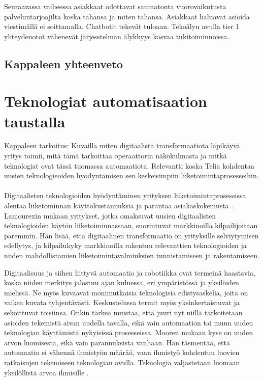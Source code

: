 \documentclass[finnish,12pt,a4paper,pdftex]{article}
\begin{document}
Seuraavassa vaiheessa asiakkaat odottavat saumatonta vuorovaikutusta palveluntarjoajilta koska tahansa ja miten tahansa.
Asiakkaat haluavat asioida viestimällä ei soittamalla.
Chatbotit tekevät tuloaan.
Tekoälyn avulla tier 1 yhteydenotot vähenevät järjesstelmän älykkyys kasvaa tukitoiminnoissa.

\subsection{Kappaleen yhteenveto}

\section{Teknologiat automatisaation taustalla}
Kappaleen tarkoitus: Kuvailla miten digitaalista transformaatiota läpikäyvä yritys toimii, mitä tämä tarkoittaa operaattorin näkökulmasta ja mitkä teknologiat ovat tässä tuomassa automaatiota. Relevantti koska Telia kohdentaa uusien teknologieoiden hyödyntämisen sen keskeisimpiin liiketoimintaprosesseihin. \\\\

Digitaalisten teknologioiden hyödyntäminen yrityksen liiketoimintaprosessissa alentaa liiketominnan käyttökustannuksia ja parantaa asiakaskokemusta  \citep{lamoureux, jungner}. Lamourexin mukaan yritykset, jotka omaksuvat uusien digitaalisten teknologioiden käytön liiketoiminnassaan, suoriutuvat markkinoilla kilpailijoitaan paremmin. Hän lisää, että digitaalinen transformaatio on yrityksille selviytymisen edellytys, ja kilpailukyky markkinoilla rakentuu relevanttien teknologioiden ja niiden mahdollistamien liiketoimintavalmiuksien tunnistamiseen ja rakentamiseen. 

Digitaalisuus ja siihen liittyvä automaatio ja robotiikka ovat termeinä haastavia, koska niiden merkitys jalostuu ajan kuluessa, eri ympäristössä ja yksilöiden mielissä. Ne myös kuvaavat monimutkaisia teknologisia edistysaskelia, joita on vaikea kuvata tyhjentävästi. Keskustelussa termit myös yksinkertaistuvat ja sekoittuvat toisiinsa. Onkin tärkeä muistaa, että juuri nyt niillä tarkoitetaan asioiden tekemistä aivan uudella tavalla, eikä vain automaation tai muun uuden teknologian käyttämistä nykyisissä prosesseissa. Mooren \citeyearpar{susanmoore} mukaan kyse on uuden arvon luomisesta, eikä vain parannuksista vanhaan. Hän täsmentää, että automaatio ei vähennä ihmistyön määrää, vaan ihmistyö kohdentuu luovien ratkaisujen tekemiseen teknologian avulla. Teknologia valjastetaan luomaan yksilöllistä arvoa ihmisille \citep{jungner, susanmoore}.
\end{document}

